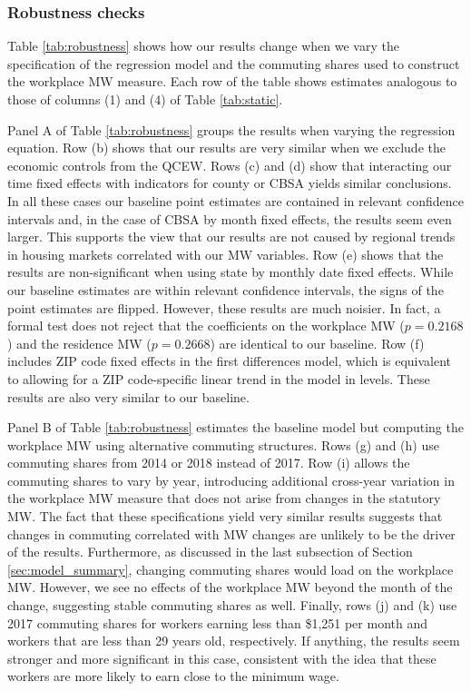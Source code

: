 \subsubsection{Robustness checks}

Table \ref{tab:robustness} shows how our results change when we vary the
specification of the regression model and the commuting shares used 
to construct the workplace MW measure.
Each row of the table shows estimates analogous to those of columns (1) and (4)
of Table \ref{tab:static}.

Panel A of Table \ref{tab:robustness} groups the results when varying the 
regression equation.
Row (b) shows that our results are very similar when we exclude the 
economic controls from the QCEW.
Rows (c) and (d) show that interacting our time fixed effects with indicators 
for county or CBSA yields similar conclusions.
In all these cases our baseline point estimates are contained in relevant 
confidence intervals and, in the case of CBSA by month fixed effects, 
the results seem even larger.
This supports the view that our results are not caused by regional trends 
in housing markets correlated with our MW variables.
Row (e) shows that the results are non-significant when using state by 
monthly date fixed effects.
While our baseline estimates are within relevant confidence intervals, the 
signs of the point estimates are flipped.
However, these results are much noisier.
In fact, a formal test does not reject that the coefficients on the workplace 
MW ($p=0.2168$) and the residence MW ($p=0.2668$) are identical to our baseline.
Row (f) includes ZIP code fixed effects in the first differences model, which
is equivalent to allowing for a ZIP code-specific linear trend in the model in 
levels.
These results are also very similar to our baseline.

Panel B of Table \ref{tab:robustness} estimates the baseline model but 
computing the workplace MW using alternative commuting structures.
Rows (g) and (h) use commuting shares from 2014 or 2018 instead of 2017.
Row (i) allows the commuting shares to vary by year, introducing additional
cross-year variation in the workplace MW measure that does not arise from 
changes in the statutory MW.
The fact that these specifications yield very similar results suggests that 
changes in commuting correlated with MW changes are unlikely to be the driver
of the results.
Furthermore, as discussed in the last subsection of Section \ref{sec:model_summary},
changing commuting shares would load on the workplace MW.
However, we see no effects of the workplace MW beyond the month of the 
change, suggesting stable commuting shares as well.
Finally, rows (j) and (k) use 2017 commuting shares for workers earning 
less than \$1,251 per month and workers that are less than 29 years old, 
respectively.
If anything, the results seem stronger and more significant in this case, 
consistent with the idea that these workers are more likely to earn close to the 
minimum wage.

